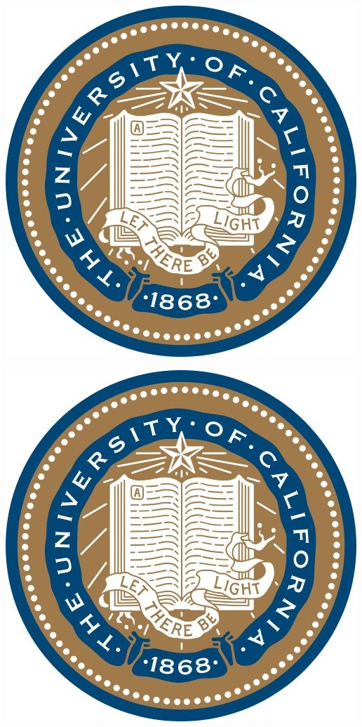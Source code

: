 \documentclass[landscape,a0paper,fontscale=0.285]{baposter} %
\begin{document}
\begin{poster}
{\begin{multicols}{2}
\end{multicols}


\begin{multicols}{2}

\begin{center}
\includegraphics[scale=0.25]{logo_cal}
\end{center}

\begin{center}
\includegraphics[scale=0.25]{logo_cal}
\end{center}


\end{multicols}}
\end{poster}
\end{document}
